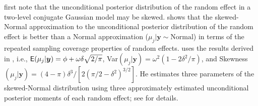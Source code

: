 \documentclass[article]{jss}
\begin{document}
\cite{morris2012} first note that the unconditional posterior distribution of the random effect in a two-level conjugate Gaussian model may be skewed. \cite{kelly2014advances}  shows that the skewed-Normal approximation to the unconditional posterior distribution of the random effect is better than a Normal approximation ($\mu_j\vert\boldsymbol{y}\sim \textrm{Normal}$) in terms of the repeated sampling coverage properties of random effects. \cite{kelly2014advances} uses  the results derived in \cite{azzalini1985class}, i.e., $\mathsf{E}(\mu_j\vert \boldsymbol{y}) =\phi+\omega\delta\sqrt{2/\pi}$, Var$(\mu_j\vert \boldsymbol{y})=\omega^2(1-2\delta^2/\pi)$, and Skewness$(\mu_j\vert \boldsymbol{y})=(4-\pi)\delta^3/[2(\pi/2-\delta^2)^{3/2}]$. He estimates three parameters of the skewed-Normal distribution using  three approximately estimated unconditional posterior  moments of each random effect; see \cite{kelly2014advances} for details. 
\end{document}

